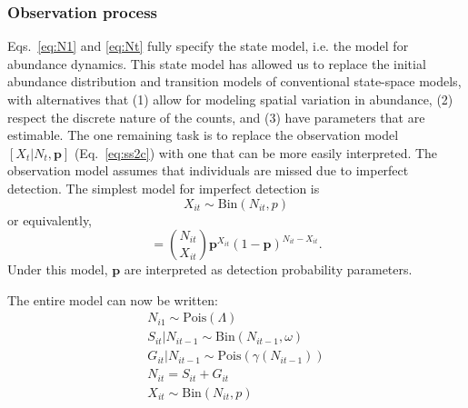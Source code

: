 \documentclass[12pt]{article}
\begin{document}

\subsubsection{Observation process}

Eqs.~\ref{eq:N1} and \ref{eq:Nt} fully specify the state model,
i.e. the model for abundance dynamics. This state
model has allowed us to replace the initial abundance
distribution and transition models of conventional state-space models, with
alternatives that (1) allow for modeling spatial variation in
abundance, (2) respect the discrete nature of the counts, and
(3) have parameters that are estimable. The one
remaining task is to replace the observation model
$[X_t|N_t, \bm{p}]$ (Eq.~\ref{eq:ss2c}) with one that can be
more easily interpreted. The observation
model assumes that individuals are missed due to imperfect
detection. The simplest model for imperfect detection is
\begin{equation}
  X_{it} \sim \mathrm{Bin}(N_{it}, p)
  \label{eq:p1}
\end{equation}
or equivalently,
\begin{equation}
[X_{it} | N_{it}, \bm{p}] = \binom{N_{it}}{X_{it}}
\bm{p}^{X_{it}}(1-\bm{p})^{N_{it}-X_{it}}.
  \label{eq:1}
\end{equation}
Under this model, $\bm{p}$ are interpreted as detection
probability parameters.


The entire model can now be written:
\begin{gather}
  N_{i1} \sim \text{Pois}(\Lambda) \nonumber \\
S_{it}|N_{it-1} \sim \mathrm{Bin}(N_{it-1}, \omega) \nonumber \\  
G_{it}|N_{it-1}\sim \mathrm{Pois}(\gamma(N_{it-1})) \\
  N_{it} = S_{it}+G_{it} \nonumber \\
  X_{it} \sim \text{Bin}(N_{it}, p) \nonumber
  \label{eq:hm}
\end{gather}
\end{document}
